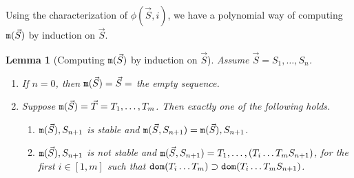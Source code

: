 \documentclass{lmcs}
\newtheorem{lemma}[theorem]{Lemma}
\begin{document}
Using the characterization of $\phi(\vec{S},i)$, we have a polynomial
way of computing ${\tt m}(\vec{S})$ by induction on $\vec{S}$.

\begin{lemma}[Computing ${\tt m}(\vec{S})$ by induction on $\vec{S}$]
\label{lemma-minstable-inductive}
Assume $\vec{S} = S_1, \ldots, S_n$. 
\begin{enumerate}
\item
If $n=0$, then ${\tt m}(\vec{S}) = \vec{S} = $ the empty sequence.
\item
Suppose ${\tt m}(\vec{S}) = \vec{T} = T_1, \ldots, T_m$. Then exactly
one of the following holds.
\begin{enumerate}
\item
${\tt m}(\vec{S}), S_{n+1}$ is stable and 
${\tt m}(\vec{S}, S_{n+1}) = {\tt m}(\vec{S}), S_{n+1}$.
\item
${\tt m}(\vec{S}), S_{n+1}$ is \emph{not} stable and
${\tt m}(\vec{S}, S_{n+1}) = T_1, \ldots, (T_i \ldots T_m S_{n+1})$, 
for the first $i \in [1,m]$ such that 
${\tt dom}(T_i \ldots T_m) \supset {\tt dom}(T_i \ldots T_m S_{n+1})$.
\end{enumerate}
\end{enumerate}
\end{lemma}
\end{document}
